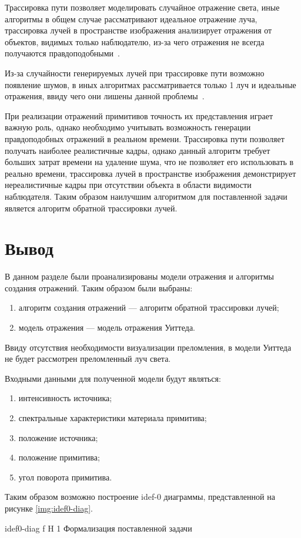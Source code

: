 Трассировка пути позволяет моделировать случайное отражение света, иные алгоритмы в общем случае рассматривают идеальное отражение луча,
трассировка лучей в пространстве изображения анализирует отражения от  объектов, видимых только наблюдателю, из-за чего отражения не всегда получаются правдоподобными~\cite{SSR,path_tracing}.

Из-за случайности генерируемых лучей при трассировке пути возможно появление шумов, в иных алгоритмах рассматривается только 1 луч и идеальные отражения, ввиду чего они лишены данной проблемы~\cite{path_tracing}.




При реализации отражений примитивов точность их представления играет важную роль, однако необходимо учитывать возможность генерации правдоподобных отражений
в реальном времени. Трассировка пути позволяет получать наиболее реалистичные кадры, однако данный алгоритм требует больших затрат времени на удаление шума, что
не позволяет его использовать в реально времени, трассировка лучей в пространстве изображения демонстрирует нереалистичные кадры при 
отсутствии объекта в области видимости наблюдателя. Таким образом наилучшим алгоритмом для поставленной задачи является алгоритм обратной трассировки лучей.


\section*{Вывод}
В данном разделе были проанализированы модели отражения и алгоритмы создания отражений.
Таким образом были выбраны:
\begin{enumerate}
	\item алгоритм создания отражений --- алгоритм обратной трассировки лучей;
	\item модель отражения --- модель отражения Уиттеда.
\end{enumerate}
Ввиду отсутствия необходимости визуализации преломления, в модели Уиттеда не будет рассмотрен преломленный луч света.



Входными данными для полученной модели будут являться:
\begin{enumerate}
	\item интенсивность источника;
	\item спектральные характеристики материала примитива;
	\item положение источника;
	\item положение примитива;
	\item угол поворота примитива.
\end{enumerate}

Таким образом возможно построение idef-0 диаграммы, представленной на рисунке \ref{img:idef0-diag}.

{idef0-diag} %
{f} %
{H} %
{1\textwidth} %
{Формализация поставленной задачи} %

